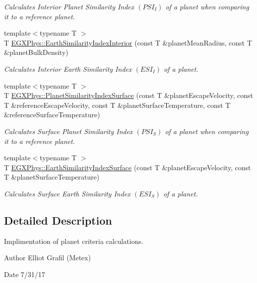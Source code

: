 \begin{DoxyCompactItemize}
\begin{DoxyCompactList}\small\item\em Calculates Interior Planet Similarity Index $(PSI_I)$ of a planet when comparing it to a reference planet. \end{DoxyCompactList}\item 
{\footnotesize template$<$typename T $>$ }\\T \mbox{\hyperlink{group___e_g_x_phys-_planet_criteria_ga699bcc2f17b8855eaa856595d8032f61}{E\+G\+X\+Phys\+::\+Earth\+Similarity\+Index\+Interior}} (const T \&planet\+Mean\+Radius, const T \&planet\+Bulk\+Density)
\begin{DoxyCompactList}\small\item\em Calculates Interior Earth Similarity Index $(ESI_I)$ of a planet. \end{DoxyCompactList}\item 
{\footnotesize template$<$typename T $>$ }\\T \mbox{\hyperlink{group___e_g_x_phys-_planet_criteria_gae0c7dce2779d66b0560ca388a34ddc39}{E\+G\+X\+Phys\+::\+Planet\+Similarity\+Index\+Surface}} (const T \&planet\+Escape\+Velocity, const T \&reference\+Escape\+Velocity, const T \&planet\+Surface\+Temperature, const T \&reference\+Surface\+Temperature)
\begin{DoxyCompactList}\small\item\em Calculates Surface Planet Similarity Index $(PSI_S)$ of a planet when comparing it to a reference planet. \end{DoxyCompactList}\item 
{\footnotesize template$<$typename T $>$ }\\T \mbox{\hyperlink{group___e_g_x_phys-_planet_criteria_ga1df772b0ed354ca7f7e4a7a4af072325}{E\+G\+X\+Phys\+::\+Earth\+Similarity\+Index\+Surface}} (const T \&planet\+Escape\+Velocity, const T \&planet\+Surface\+Temperature)
\begin{DoxyCompactList}\small\item\em Calculates Surface Earth Similarity Index $(ESI_S)$ of a planet. \end{DoxyCompactList}\end{DoxyCompactItemize}


\subsection{Detailed Description}
Implimentation of planet criteria calculations. 

\begin{DoxyAuthor}{Author}
Elliot Grafil (Metex) 
\end{DoxyAuthor}
\begin{DoxyDate}{Date}
7/31/17 
\end{DoxyDate}
